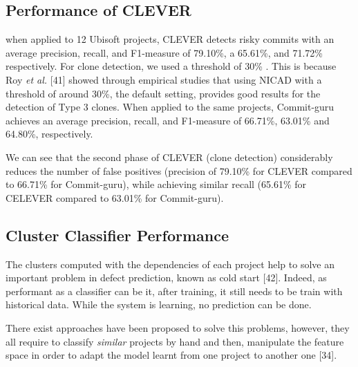\documentclass[sigconf]{acmart}
\begin{document}
\subsection{Performance of CLEVER}\label{performance-of-clever}

when applied to 12 Ubisoft projects, CLEVER detects risky commits with
an average precision, recall, and F1-measure of 79.10\%, a 65.61\%, and
71.72\% respectively. For clone detection, we used a threshold of 30\% .
This is because Roy \emph{et al.} {[}41{]} showed through empirical
studies that using NICAD with a threshold of around 30\%, the default
setting, provides good results for the detection of Type 3 clones. When
applied to the same projects, Commit-guru achieves an average precision,
recall, and F1-measure of 66.71\%, 63.01\% and 64.80\%, respectively.

We can see that the second phase of CLEVER (clone detection)
considerably reduces the number of false positives (precision of 79.10\%
for CLEVER compared to 66.71\% for Commit-guru), while achieving similar
recall (65.61\% for CELEVER compared to 63.01\% for Commit-guru).

\subsection{Cluster Classifier
Performance}\label{cluster-classifier-performance}

The clusters computed with the dependencies of each project help to
solve an important problem in defect prediction, known as cold start
{[}42{]}. Indeed, as performant as a classifier can be it, after
training, it still needs to be train with historical data. While the
system is learning, no prediction can be done.

There exist approaches have been proposed to solve this problems,
however, they all require to classify \emph{similar} projects by hand
and then, manipulate the feature space in order to adapt the model
learnt from one project to another one {[}34{]}.
\end{document}
